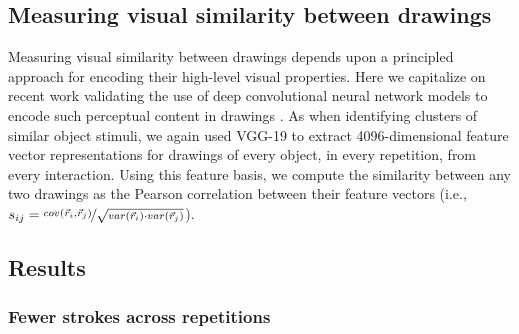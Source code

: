 \documentclass[10pt,letterpaper]{article}
\begin{document}



\subsection{Measuring visual similarity between drawings}

Measuring visual similarity between drawings depends upon a principled approach for encoding their high-level visual properties.
Here we capitalize on recent work validating the use of deep convolutional neural network models to encode such perceptual content in drawings \cite{FanCommon2018}.
As when identifying clusters of similar object stimuli, we again used VGG-19 to extract 4096-dimensional feature vector representations for drawings of every object, in every repetition, from every interaction.
Using this feature basis, we compute the similarity between any two drawings as the Pearson correlation between their feature vectors (i.e., $s_{ij} =  \nicefrac{cov(\vec{r}_{i}, \vec{r}_{j})}{\sqrt{var(\vec{r}_{i}) \cdot var(\vec{r}_{j})}}$).

\subsection{Results}
\subsubsection{Fewer strokes across repetitions}
\end{document}

